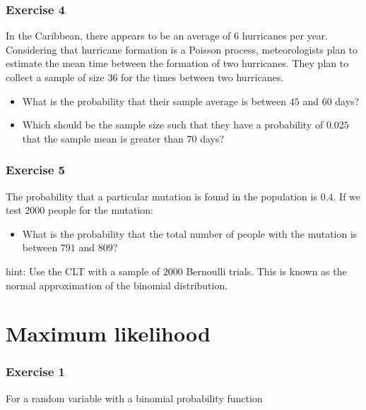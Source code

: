 \documentclass[
]{book}
\providecommand{\tightlist}{%
  \setlength{\itemsep}{0pt}\setlength{\parskip}{0pt}}
\begin{document}
\hypertarget{exercise-4-3}{%
\subsubsection{Exercise 4}\label{exercise-4-3}}

In the Caribbean, there appears to be an average of \(6\) hurricanes per year. Considering that hurricane formation is a Poisson process, meteorologists plan to estimate the mean time between the formation of two hurricanes. They plan to collect a sample of size \(36\) for the times between two hurricanes.

\begin{itemize}
\item
  What is the probability that their sample average is between \(45\) and \(60\) days?
\item
  Which should be the sample size such that they have a probability of \(0.025\) that the sample mean is greater than \(70\) days?
\end{itemize}

\hypertarget{exercise-5-2}{%
\subsubsection{Exercise 5}\label{exercise-5-2}}

The probability that a particular mutation is found in the population is \(0.4\). If we test \(2000\) people for the mutation:

\begin{itemize}
\tightlist
\item
  What is the probability that the total number of people with the mutation is between \(791\) and \(809\)?
\end{itemize}

hint: Use the CLT with a sample of \(2000\) Bernoulli trials. This is known as the normal approximation of the binomial distribution.

\hypertarget{maximum-likelihood}{%
\section{Maximum likelihood}\label{maximum-likelihood}}

\hypertarget{exercise-1-7}{%
\subsubsection{Exercise 1}\label{exercise-1-7}}

For a random variable with a binomial probability function
\end{document}
